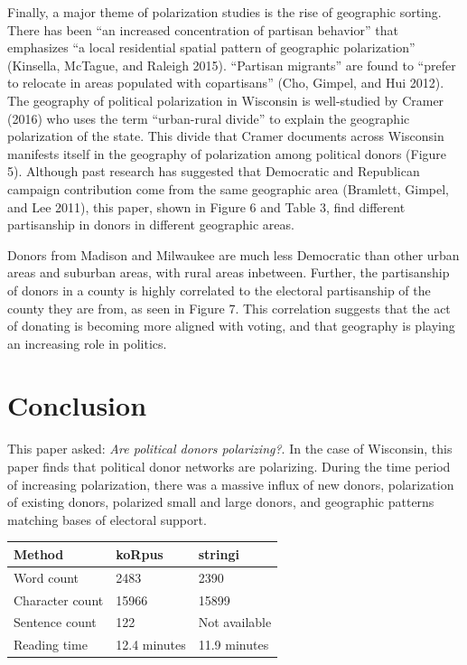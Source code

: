 \documentclass[12pt,]{article}
\begin{document}
Finally, a major theme of polarization studies is the rise of geographic
sorting. There has been ``an increased concentration of partisan
behavior'' that emphasizes ``a local residential spatial pattern of
geographic polarization'' (Kinsella, McTague, and Raleigh 2015).
``Partisan migrants'' are found to ``prefer to relocate in areas
populated with copartisans'' (Cho, Gimpel, and Hui 2012). The geography
of political polarization in Wisconsin is well-studied by Cramer (2016)
who uses the term ``urban-rural divide'' to explain the geographic
polarization of the state. This divide that Cramer documents across
Wisconsin manifests itself in the geography of polarization among
political donors (Figure 5). Although past research has suggested that
Democratic and Republican campaign contribution come from the same
geographic area (Bramlett, Gimpel, and Lee 2011), this paper, shown in
Figure 6 and Table 3, find different partisanship in donors in different
geographic areas.

Donors from Madison and Milwaukee are much less Democratic than other
urban areas and suburban areas, with rural areas inbetween. Further, the
partisanship of donors in a county is highly correlated to the electoral
partisanship of the county they are from, as seen in Figure 7. This
correlation suggests that the act of donating is becoming more aligned
with voting, and that geography is playing an increasing role in
politics.

\hypertarget{conclusion}{%
\section{Conclusion}\label{conclusion}}

This paper asked: \emph{Are political donors polarizing?}. In the case
of Wisconsin, this paper finds that political donor networks are
polarizing. During the time period of increasing polarization, there was
a massive influx of new donors, polarization of existing donors,
polarized small and large donors, and geographic patterns matching bases
of electoral support.

\newpage

\begin{longtable}[]{@{}lll@{}}
\toprule
Method & koRpus & stringi\tabularnewline
\midrule
\endhead
Word count & 2483 & 2390\tabularnewline
Character count & 15966 & 15899\tabularnewline
Sentence count & 122 & Not available\tabularnewline
Reading time & 12.4 minutes & 11.9 minutes\tabularnewline
\bottomrule
\end{longtable}
\end{document}
